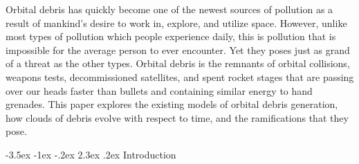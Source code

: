 \documentclass[a4paper, 12pt]{article}
\makeatletter
\renewcommand\section{\clearpage\newpage\@startsection {section}{1}{\z@}%
	{-3.5ex \@plus -1ex \@minus -.2ex}%
	{2.3ex \@plus.2ex}%
	{\normalfont\Large\bfseries}}
\makeatother
\begin{document}
\myskip
\doublespace
Orbital debris has quickly become one of the newest sources of pollution as a result of mankind's desire to work in, explore, and utilize space. However, unlike most types of pollution which people experience daily, this is pollution that is impossible for the average person to ever encounter. Yet they poses just as grand of a threat as the other types. Orbital debris is the remnants of orbital collisions, weapons tests, decommissioned satellites, and spent rocket stages that are passing over our heads faster than bullets and containing similar energy to hand grenades. This paper explores the existing models of orbital debris generation, how clouds of debris evolve with respect to time, and the ramifications that they pose.
\singlespace
\newpage


\tableofcontents

\cleardoublepage
{}\listoffigures

\cleardoublepage
{}\listoftables

\glsaddall
\cleardoublepage
{}\printglossary[title={List of Symbols}, nonumberlist]

\newpage
\setlength{\parindent}{1em}



\section{Introduction}
\label{introduction}
\doublespace
\end{document}
